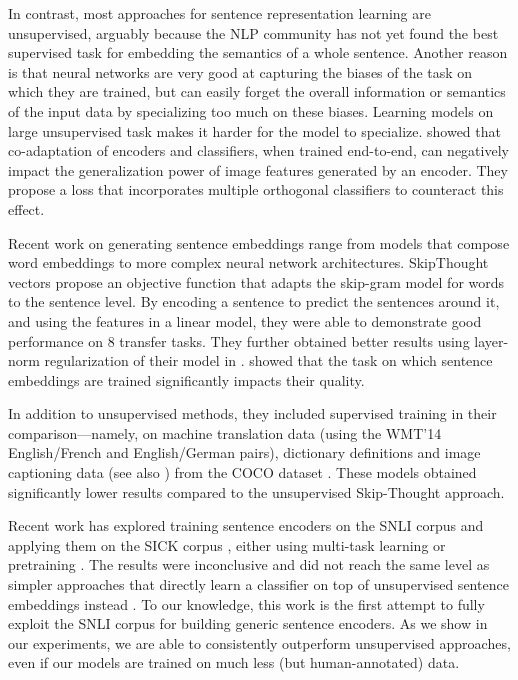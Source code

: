 \documentclass[11pt,letterpaper]{article}
\begin{document}
In contrast, most approaches for sentence representation learning are unsupervised, arguably because the NLP community has not yet found the best supervised task for embedding the semantics of a whole sentence. Another reason is that neural networks are very good at capturing the biases of the task on which they are trained, but can easily forget the overall information or semantics of the input data by specializing too much on these biases. Learning models on large unsupervised task makes it harder for the model to specialize.  showed that co-adaptation of encoders and classifiers, when trained end-to-end, can negatively impact the generalization power of image features generated by an encoder. They propose a loss that incorporates multiple orthogonal classifiers to counteract this effect.

Recent work on generating sentence embeddings range from models that compose word embeddings \cite{le2014distributed, arora2016asimple, wieting2015towards} to more complex neural network architectures. SkipThought vectors \cite{kiros2015skip} propose an objective function that adapts the skip-gram  model for words \cite{mikolov2013distributed} to the sentence level. By encoding a sentence to predict the sentences around it, and using the features in a linear model, they were able to demonstrate good performance on 8 transfer tasks. They further obtained better results using layer-norm regularization of their model in \cite{ba2016layer}.  showed that the task on which sentence embeddings are trained significantly impacts their quality.

In addition to unsupervised methods, they included supervised training in their comparison---namely, on machine translation data (using the WMT'14 English/French and English/German pairs), dictionary definitions and image captioning data (see also \citet{kiela2017learning}) from the COCO dataset \cite{lin2014microsoft}. These models obtained significantly lower results compared to the unsupervised Skip-Thought approach.

Recent work has explored training sentence encoders on the SNLI corpus and applying them on the SICK corpus \cite{marelli2014sick}, either using multi-task learning or pretraining \cite{mou2016transferable, bowman2015large}. The results were inconclusive and did not reach the same level as simpler approaches that directly learn a classifier on top of unsupervised sentence embeddings instead \cite{arora2016asimple}. To our knowledge, this work is the first attempt to fully exploit the SNLI corpus for building generic sentence encoders. As we show in our experiments, we are able to consistently outperform unsupervised approaches, even if our models are trained on much less (but human-annotated) data.
\end{document}
